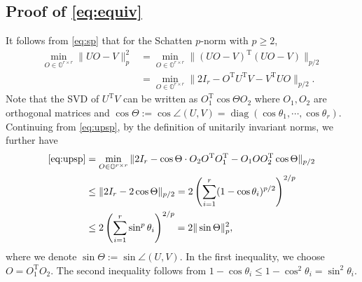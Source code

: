 \documentclass[reqno]{amsart}
\DeclareMathOperator{\diag}{diag}
\newcommand{\T}{\mathrm{T}}
\theoremstyle{plain}
\theoremstyle{definition}
\begin{document}
\subsection{Proof of \eqref{eq:equiv}}\label{app:proofofnorm}
It follows from \eqref{eq:sp} that for the Schatten $p$-norm with $p\ge 2$, 
\begin{align}\label{eq:upsp}
\min_{O\in \mathbb{O}^{r\times r}} \| UO- V\|_p^2 &= \min_{O\in \mathbb{O}^{r\times r}} \| (UO- V)^\T (UO- V)\|_{p/2} \nonumber\\
&=\min_{O\in \mathbb{O}^{r\times r}} \| 2I_r - O^\T U^\T V - V^\T U O\|_{p/2}.
\end{align}
Note that the SVD of $U^\T V$ can be written as $O_1^\T \cos\Theta O_2$ where $O_1,O_2$ are orthogonal matrices and $\cos\Theta:=\cos\angle(U,V)=\diag(\cos \theta_1,\cdots, \cos \theta_r)$. Continuing from \eqref{eq:upsp}, by the definition of unitarily invariant norms, we further have
\begin{align*}
\eqref{eq:upsp} &= \min_{O\in \mathbb{O}^{r\times r}} \| 2 I_r - \cos\Theta \cdot O_2O^\T O_1^\T - O_1 O O_2^\T \cos\Theta\|_{p/2} \nonumber\\
&\le \| 2I_r - 2 \cos\Theta\|_{p/2} = 2 \left( \sum_{i=1}^r (1-\cos\theta_i)^{p/2}\right)^{2/p} \\
&\le 2 \left( \sum_{i=1}^r \sin^{p}\theta_i\right)^{2/p}=2\|\sin\Theta\|_p^2,
\end{align*}
where we denote $\sin\Theta:=\sin\angle(U,V)$. In the first inequality, we choose $O=O_1^\T O_2$. The second inequality follows from $1-\cos\theta_i \le 1-\cos^2\theta_i=\sin^2\theta_i.$
\end{document}
